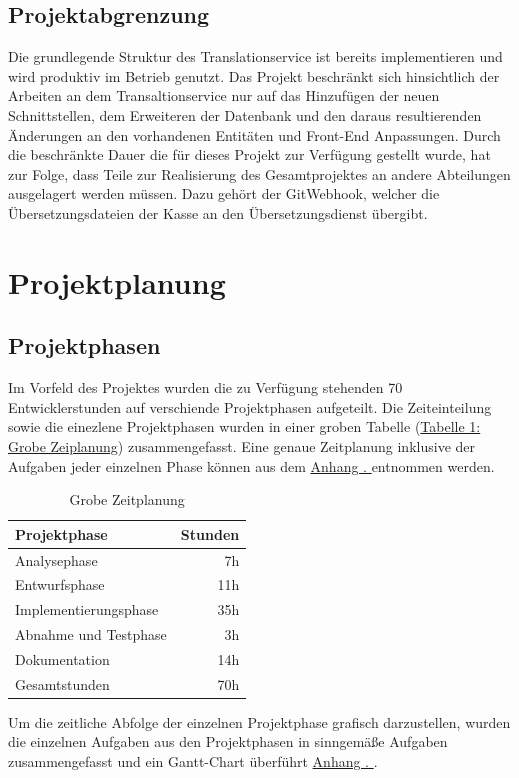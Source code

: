 \documentclass[10pt, oneside]{article}
\newcommand{\attsecref}[1]{\hyperref[{#1}]{Anhang \thesubsection. \nameref*{#1}}}
\begin{document}
  \subsection{Projektabgrenzung}%
    Die grundlegende Struktur des Translationservice ist bereits implementieren und wird produktiv im Betrieb genutzt. Das Projekt beschränkt sich hinsichtlich der Arbeiten an dem Transaltionservice nur auf das Hinzufügen der 
    neuen Schnittstellen, dem Erweiteren der Datenbank und den daraus resultierenden Änderungen an den vorhandenen Entitäten und Front-End Anpassungen.
    Durch die beschränkte Dauer die für dieses Projekt zur Verfügung gestellt wurde, hat zur Folge, dass Teile zur Realisierung des Gesamtprojektes an andere Abteilungen ausgelagert werden müssen.
    Dazu gehört der GitWebhook, welcher die Übersetzungsdateien der Kasse an den Übersetzungsdienst übergibt.
  \section{Projektplanung}
  \subsection{Projektphasen}%
    Im Vorfeld des Projektes wurden die zu Verfügung stehenden 70 Entwicklerstunden auf verschiende Projektphasen aufgeteilt. 
    Die Zeiteinteilung sowie die einezlene Projektphasen wurden in einer groben Tabelle (\hyperref[tab:timing]{Tabelle 1: Grobe Zeiplanung}) zusammengefasst.
    Eine genaue Zeitplanung inklusive der Aufgaben jeder einzelnen Phase können aus dem \attsecref{sec:detailTime} entnommen werden. 
    \begin{table}[ht]
      \label{tab:timing}
      \centering
    \begin{tabular}{| l | r |}
      \hline
      \rowcolor{carolinablue}
      Projektphase & Stunden \\
      \hline
      Analysephase & 7h \\
      \hline
      \rowcolor{lightgray}
      Entwurfsphase & 11h\\
      \hline
      Implementierungsphase & 35h\\
      \hline
      \rowcolor{lightgray}
      Abnahme und Testphase & 3h\\
      \hline
      Dokumentation & 14h \\
      \hline
      \rowcolor{carolinablue}
      Gesamtstunden & 70h\\
      \hline
    \end{tabular}
    \caption{Grobe Zeitplanung}
  \end{table}
    Um die zeitliche Abfolge der einzelnen Projektphase grafisch darzustellen, wurden die einzelnen Aufgaben aus den 
    Projektphasen in sinngemäße Aufgaben zusammengefasst und ein Gantt-Chart überführt \attsecref{sec:GanttChart}.
\end{document}
